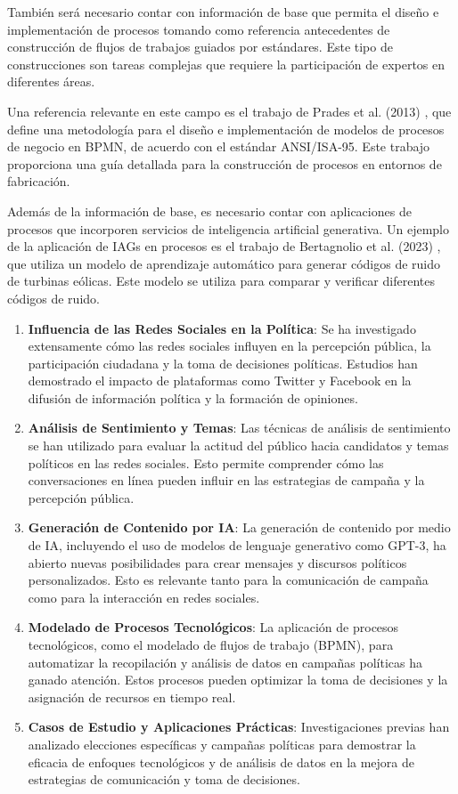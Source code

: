 \documentclass[12pt]{article}
\begin{document}
También será necesario contar con información de base que permita el diseño e implementación de procesos tomando como referencia antecedentes de construcción de flujos de trabajos guiados por estándares. Este tipo de construcciones son tareas complejas que requiere la participación de expertos en diferentes áreas. 

Una referencia relevante en este campo es el trabajo de Prades et al. (2013) \cite{PRADES2013115}, que define una metodología para el diseño e implementación de modelos de procesos de negocio en BPMN, de acuerdo con el estándar ANSI/ISA-95. Este trabajo proporciona una guía detallada para la construcción de procesos en entornos de fabricación.

Además de la información de base, es necesario contar con aplicaciones de procesos que incorporen servicios de inteligencia artificial generativa. Un ejemplo de la aplicación de IAGs en procesos es el trabajo de Bertagnolio et al. (2023) \cite{bertagnolio2023}, que utiliza un modelo de aprendizaje automático para generar códigos de ruido de turbinas eólicas. Este modelo se utiliza para comparar y verificar diferentes códigos de ruido.


\begin{enumerate}
\item \textbf{Influencia de las Redes Sociales en la Política}: Se ha investigado extensamente cómo las redes sociales influyen en la percepción pública, la participación ciudadana y la toma de decisiones políticas. Estudios han demostrado el impacto de plataformas como Twitter y Facebook en la difusión de información política y la formación de opiniones.

\item \textbf{Análisis de Sentimiento y Temas}: Las técnicas de análisis de sentimiento se han utilizado para evaluar la actitud del público hacia candidatos y temas políticos en las redes sociales. Esto permite comprender cómo las conversaciones en línea pueden influir en las estrategias de campaña y la percepción pública.

\item \textbf{Generación de Contenido por IA}: La generación de contenido por medio de IA, incluyendo el uso de modelos de lenguaje generativo como GPT-3, ha abierto nuevas posibilidades para crear mensajes y discursos políticos personalizados. Esto es relevante tanto para la comunicación de campaña como para la interacción en redes sociales.

\item \textbf{Modelado de Procesos Tecnológicos}: La aplicación de procesos tecnológicos, como el modelado de flujos de trabajo (BPMN), para automatizar la recopilación y análisis de datos en campañas políticas ha ganado atención. Estos procesos pueden optimizar la toma de decisiones y la asignación de recursos en tiempo real.

\item \textbf{Casos de Estudio y Aplicaciones Prácticas}: Investigaciones previas han analizado elecciones específicas y campañas políticas para demostrar la eficacia de enfoques tecnológicos y de análisis de datos en la mejora de estrategias de comunicación y toma de decisiones.
\end{enumerate}
\end{document}
